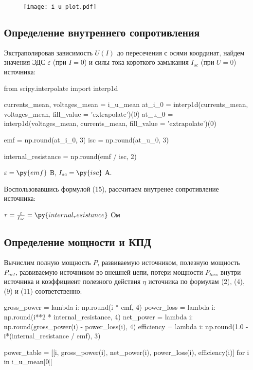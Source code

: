 \documentclass[12pt, a4paper]{article}
\begin{document}
\begin{figure}[H]
\texttt{[image: i\_u\_plot.pdf]}
\end{figure}

\subsection*{Определение внутреннего сопротивления}

Экстраполировав зависимость $U(I)$ до пересечения с осями координат,
найдем значения ЭДС $\varepsilon$ (при $I = 0$) и силы тока
короткого замыкания $I_{sc}$ (при $U = 0$) источника:

\begin{pycode}
from scipy.interpolate import interp1d

currents_mean, voltages_mean = i_u_mean
at_i_0 = interp1d(currents_mean, voltages_mean, fill_value = 'extrapolate')(0)
at_u_0 = interp1d(voltages_mean, currents_mean, fill_value = 'extrapolate')(0)

emf = np.round(at_i_0, 3)
isc = np.round(at_u_0, 3)

internal_resistance = np.round(emf / isc, 2)
\end{pycode}

\noindent
$\varepsilon = \py{emf}$ В, $I_{sc} = \py{isc}$ А.

Воспользовавшись формулой (15), рассчитаем внутренее сопротивление источника:

\noindent
$r = \frac{\varepsilon}{I_{sc}} = \py{internal_resistance}$ Ом

\subsection*{Определение мощности и КПД}  

Вычислим полную мощность $P$, развиваемую источником, полезную мощность $P_{net}$,
развиваемую источником во внешней цепи, потери мощности $P_{loss}$ внутри
источника и коэффициент полезного действия $\eta$ источника
по формулам (2), (4), (9) и (11) соответственно:

\begin{pycode}
gross_power = lambda i: np.round(i * emf, 4)
power_loss = lambda i: np.round(i**2 * internal_resistance, 4)
net_power = lambda i: np.round(gross_power(i) - power_loss(i), 4)
efficiency = lambda i: np.round(1.0 - i*(internal_resistance / emf), 3)

power_table = [[i, gross_power(i), net_power(i), power_loss(i), efficiency(i)] for i in i_u_mean[0]]
\end{pycode}
\end{document}

